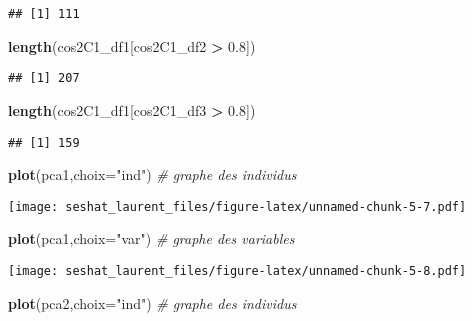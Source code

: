\documentclass[
]{article}
\newenvironment{Shaded}{\begin{snugshade}}{\end{snugshade}}
\newcommand{\CommentTok}[1]{\textcolor[rgb]{0.56,0.35,0.01}{\textit{#1}}}
\newcommand{\DataTypeTok}[1]{\textcolor[rgb]{0.13,0.29,0.53}{#1}}
\newcommand{\FloatTok}[1]{\textcolor[rgb]{0.00,0.00,0.81}{#1}}
\newcommand{\KeywordTok}[1]{\textcolor[rgb]{0.13,0.29,0.53}{\textbf{#1}}}
\newcommand{\NormalTok}[1]{#1}
\newcommand{\OperatorTok}[1]{\textcolor[rgb]{0.81,0.36,0.00}{\textbf{#1}}}
\newcommand{\StringTok}[1]{\textcolor[rgb]{0.31,0.60,0.02}{#1}}
\begin{document}
\begin{verbatim}
## [1] 111
\end{verbatim}

\begin{Shaded}
\begin{Highlighting}[]
\KeywordTok{length}\NormalTok{(cos2C1_df1[cos2C1_df2 }\OperatorTok{>}\StringTok{ }\FloatTok{0.8}\NormalTok{])}
\end{Highlighting}
\end{Shaded}

\begin{verbatim}
## [1] 207
\end{verbatim}

\begin{Shaded}
\begin{Highlighting}[]
\KeywordTok{length}\NormalTok{(cos2C1_df1[cos2C1_df3 }\OperatorTok{>}\StringTok{ }\FloatTok{0.8}\NormalTok{])}
\end{Highlighting}
\end{Shaded}

\begin{verbatim}
## [1] 159
\end{verbatim}

\begin{Shaded}
\begin{Highlighting}[]
\KeywordTok{plot}\NormalTok{(pca1,}\DataTypeTok{choix=}\StringTok{"ind"}\NormalTok{)    }\CommentTok{# graphe des individus}
\end{Highlighting}
\end{Shaded}

\texttt{[image: seshat\_laurent\_files/figure-latex/unnamed-chunk-5-7.pdf]}

\begin{Shaded}
\begin{Highlighting}[]
\KeywordTok{plot}\NormalTok{(pca1,}\DataTypeTok{choix=}\StringTok{"var"}\NormalTok{)    }\CommentTok{# graphe des variables }
\end{Highlighting}
\end{Shaded}

\texttt{[image: seshat\_laurent\_files/figure-latex/unnamed-chunk-5-8.pdf]}

\begin{Shaded}
\begin{Highlighting}[]
\KeywordTok{plot}\NormalTok{(pca2,}\DataTypeTok{choix=}\StringTok{"ind"}\NormalTok{)    }\CommentTok{# graphe des individus}
\end{Highlighting}
\end{Shaded}
\end{document}
